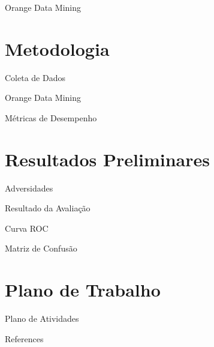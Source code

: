 \documentclass[10pt]{beamer}
\begin{document}
  \begin{frame}[fragile]{Orange Data Mining}
  \end{frame}

\section{Metodologia}
  \begin{frame}[fragile]{Coleta de Dados}
  \end{frame}

  \begin{frame}[fragile]{Orange Data Mining}
  \end{frame}
  
  \begin{frame}[fragile]{Métricas de Desempenho}
  \end{frame}

\section{Resultados Preliminares}
  \begin{frame}[fragile]{Adversidades}
  \end{frame}

  \begin{frame}[fragile]{Resultado da Avaliação}
  \end{frame}

  \begin{frame}[fragile]{Curva ROC}
  \end{frame}

  \begin{frame}[fragile]{Matriz de Confusão}
  \end{frame}

\section{Plano de Trabalho}
  \begin{frame}[fragile]{Plano de Atividades}
  \end{frame}

\appendix
\begin{frame}[allowframebreaks]{References}

  
  
\end{frame}
\end{document}
